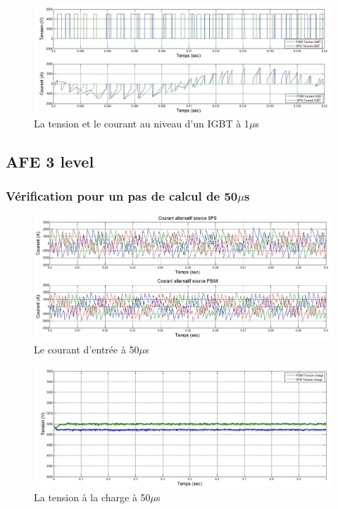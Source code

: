 \documentclass[11pt,letterpaper,final]{report}
\begin{document}
\begin{figure}[htb]
\centering
\includegraphics[scale=0.5]{Fig/AFERC/IGBT.jpg}
\caption{La tension et le courant au niveau d'un IGBT à 1$\mu$s}
\label{AF_RC_igbt}
\end{figure}

\clearpage
\subsection{AFE 3 level}
\subsubsection{Vérification pour un pas de calcul de 50$\mu$s}

\begin{figure}[htb]
\centering
\includegraphics[scale=0.5]{Fig/AFE3LEVEL/50u/cour_al.jpg}
\caption{Le courant d'entrée à 50$\mu$s}
\label{AF_3_cou50}
\end{figure}

\begin{figure}[htb]
\centering
\includegraphics[scale=0.5]{Fig/AFE3LEVEL/50u/vch.jpg}
\caption{La tension à la charge à 50$\mu$s}
\label{AF_3_vch50}
\end{figure}
\end{document}
